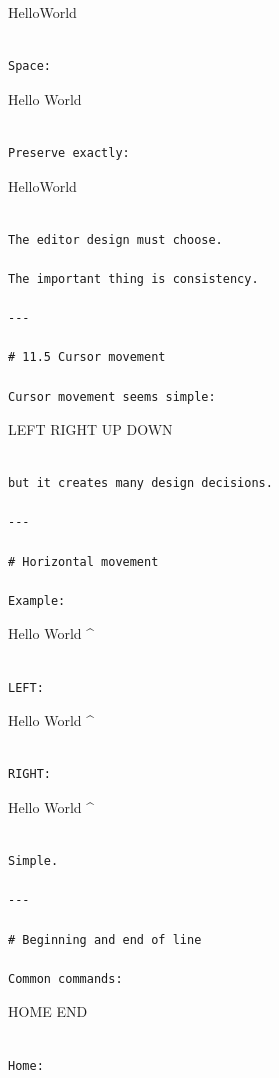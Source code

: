 \documentclass[
  oneside,
  openany]{book}
\begin{document}
HelloWorld

\begin{verbatim}

Space:
\end{verbatim}

Hello World

\begin{verbatim}

Preserve exactly:
\end{verbatim}

HelloWorld

\begin{verbatim}

The editor design must choose.

The important thing is consistency.

---

# 11.5 Cursor movement

Cursor movement seems simple:
\end{verbatim}

LEFT RIGHT UP DOWN

\begin{verbatim}

but it creates many design decisions.

---

# Horizontal movement

Example:
\end{verbatim}

Hello World \^{}

\begin{verbatim}

LEFT:
\end{verbatim}

Hello World \^{}

\begin{verbatim}

RIGHT:
\end{verbatim}

Hello World \^{}

\begin{verbatim}

Simple.

---

# Beginning and end of line

Common commands:
\end{verbatim}

HOME END

\begin{verbatim}

Home:
\end{verbatim}
\end{document}
